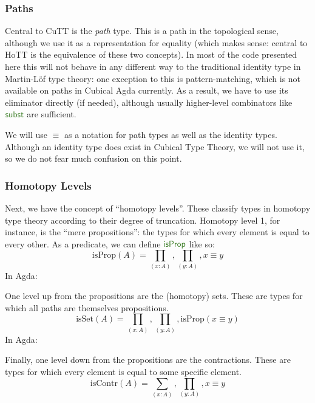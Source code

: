 \begin{refsection}
\begin{subappendices}
\subsubsection{Paths}
Central to CuTT is the \emph{path} type.
This is a path in the topological sense, although we use it as a representation
for equality (which makes sense: central to HoTT is the
equivalence of these two concepts).
In most of the code presented here this will not behave in any different way to
the traditional identity type in Martin-Löf type theory: one exception to this
is pattern-matching, which is not available on paths in Cubical Agda currently.
As a result, we have to use its eliminator directly (if needed), although
usually higher-level combinators like \(\AgdaFunction{subst}\) are sufficient.

We will use \(\equiv\) as a notation for path types as well as the identity
types.
Although an identity type does exist in Cubical Type Theory, we will not use it,
so we do not fear much confusion on this point.
\subsubsection{Homotopy Levels}
Next, we have the concept of ``homotopy levels''.
These classify types in homotopy type theory according to their degree of
truncation.
Homotopy level 1, for instance, is the ``mere propositions'': the types for
which every element is equal to every other.
As a predicate, we can define \(\AgdaFunction{isProp}\) like so:
\begin{equation}
  \text{isProp}(A) = \prod_{(x : A)} , \prod_{(y : A)} , x \equiv y
\end{equation}
In Agda:

One level up from the propositions are the (homotopy) sets.
These are types for which all paths are themselves propositions.
\begin{equation}
  \text{isSet}(A) = \prod_{(x : A)} , \prod_{(y : A)} , \text{isProp}(x \equiv y)
\end{equation}
In Agda:

Finally, one level down from the propositions are the contractions.
These are types for which every element is equal to some specific element.
\begin{equation}
  \text{isContr}(A) = \sum_{(x : A)} , \prod_{(y : A)} , x \equiv y
\end{equation}

\end{subappendices}
\end{refsection}

